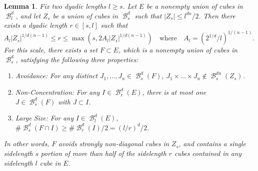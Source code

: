 \documentclass[dvipsnames,letterpaper,12pt]{article}
\numberwithin{equation}{section}
\theoremstyle{plain}
\newtheorem{lemma}{Lemma}
\DeclareMathOperator{\B}{\mathcal{B}}
\begin{document}
\begin{lemma} \label{discretelemma}
	Fix two dyadic lengths $l \geq s$. Let $E$ be a nonempty union of cubes in $\B^d_l$, and let $Z_s$ be a union of cubes in $\B^d_s$ such that $|Z_s| \leq l^{dn}/2$. Then there exists a dyadic length $r \in [s,l]$ such that
	\begin{equation} \label{rBound}
		A_l |Z_s|^{1/d(n-1)} \leq r \leq \max(s, 2 A_l |Z_s|^{1/d(n-1)})\quad \text{where}\quad A_l = (2^{1/d}/l)^{1/(n-1)}.
	\end{equation}
	For this scale, there exists a set $F \subset E$, which is a nonempty union of cubes in $\B^d_s$, satisfying the following three properties:
	\begin{enumerate}
		\item\label{avoidanceItem} \emph{Avoidance}: For any distinct $J_1, \dots, J_n \in \B^d_s(F)$, $J_1 \times \dots \times J_n \not \in \B_s^{dn}(Z_s)$.
		\item\label{nonConcentrationItem} \emph{Non-Concentration}: For any $I \in \B_r^d(E)$, there is at most one $J \in \B_s^d(F)$ with $J \subset I$.
		\item\label{largeSizeItem} \emph{Large Size}: For any $I \in \B^d_l(E)$, $\# \B^d_s(F \cap I) \geq \# \B^d_r(I) / 2 = (l/r)^d / 2$.
	\end{enumerate}
	In other words, $F$ avoids strongly non-diagonal cubes in $Z_s$, and contains a single sidelength $s$ portion of more than half of the sidelength $r$ cubes contained in any sidelength $l$ cube in $E$.
\end{lemma}
\end{document}
